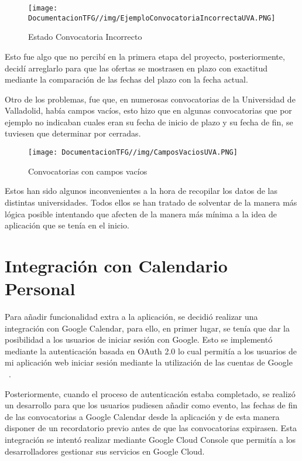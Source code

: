 \begin{figure}[H]
    \centering
    \texttt{[image: DocumentacionTFG//img/EjemploConvocatoriaIncorrectaUVA.PNG]}
    \caption{Estado Convocatoria Incorrecto}
\end{figure}

Esto fue algo que no percibí en la primera etapa del proyecto, posteriormente, decidí arreglarlo para que las ofertas se mostrasen en plazo con exactitud mediante la comparación de las fechas del plazo con la fecha actual.

Otro de los problemas, fue que, en numerosas convocatorias de la Universidad de Valladolid, había campos vacíos, esto hizo que en algunas convocatorias que por ejemplo no indicaban cuales eran su fecha de inicio de plazo y su fecha de fin, se tuviesen que determinar por cerradas.

\begin{figure}[H]
    \centering
    \texttt{[image: DocumentacionTFG//img/CamposVaciosUVA.PNG]}
    \caption{Convocatorias con campos vacíos}
\end{figure}

Estos han sido algunos inconvenientes a la hora de recopilar los datos de las distintas universidades. Todos ellos se han tratado de solventar de la manera más lógica posible intentando que afecten de la manera más mínima a la idea de aplicación que se tenía en el inicio.

\section{Integración con Calendario Personal}

Para añadir funcionalidad extra a la aplicación, se decidió realizar una integración con Google Calendar, para ello, en primer lugar, se tenía que dar la posibilidad a los usuarios de iniciar sesión con Google. Esto se implementó mediante la autenticación basada en OAuth 2.0 lo cual permitía a los usuarios de mi aplicación web iniciar sesión mediante la utilización de las cuentas de Google ~\cite{oauth2:latex}. 

Posteriormente, cuando el proceso de autenticación estaba completado, se realizó un desarrollo para que los usuarios pudiesen añadir como evento, las fechas de fin de las convocatorias a Google Calendar desde la aplicación y de esta manera disponer de un recordatorio previo antes de que las convocatorias expirasen. Esta integración se intentó realizar mediante Google Cloud Console que permitía a los desarrolladores gestionar sus servicios en Google Cloud.

